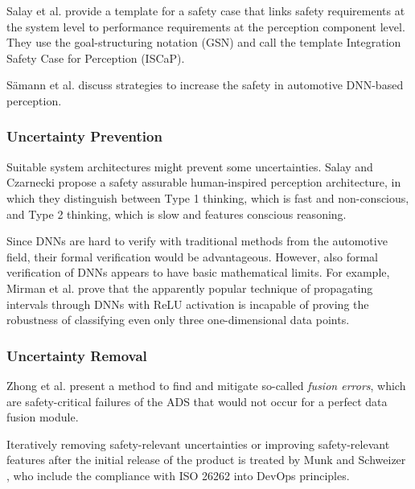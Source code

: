 \documentclass[conference]{IEEEtran}
\begin{document}
Salay et al. \cite{Salay2021missinglink} provide a template for a safety case that links safety requirements at the system level to performance requirements at the perception component level. 
They use the goal-structuring notation (GSN) and call the template Integration Safety Case for Perception (ISCaP).


Sämann et al. \cite{Saemann2020strategy} discuss strategies to increase the safety in automotive DNN-based perception.


\subsubsection{Uncertainty Prevention}
\label{sec:uncertainty_prevention}

Suitable system architectures might prevent some uncertainties. 
Salay and Czarnecki \cite{Salay2022humaninspired} propose a safety assurable human-inspired perception architecture, in which they distinguish between Type 1 thinking, which is fast and non-conscious, and Type 2 thinking, which is slow and features conscious reasoning. 



Since DNNs are hard to verify with traditional methods from the automotive field, their formal verification would be advantageous. 
However, also formal verification of DNNs appears to have basic mathematical limits. 
For example, Mirman et al. \cite{Mirman2021limits} prove that the apparently popular technique of propagating intervals through DNNs with ReLU activation is incapable of proving the robustness of classifying even only three one-dimensional data points.

\subsubsection{Uncertainty Removal}
\label{sec:uncertainty_removal}

Zhong et al. \cite{Zhong2021detecting} present a method to find and mitigate so-called \textit{fusion errors}, which are safety-critical failures of the ADS that would not occur for a perfect data fusion module.

Iteratively removing safety-relevant uncertainties or improving safety-relevant features after the initial release of the product is treated by Munk and Schweizer \cite{Munk2022safeops}, who include the compliance with ISO 26262 into DevOps principles.
\end{document}
